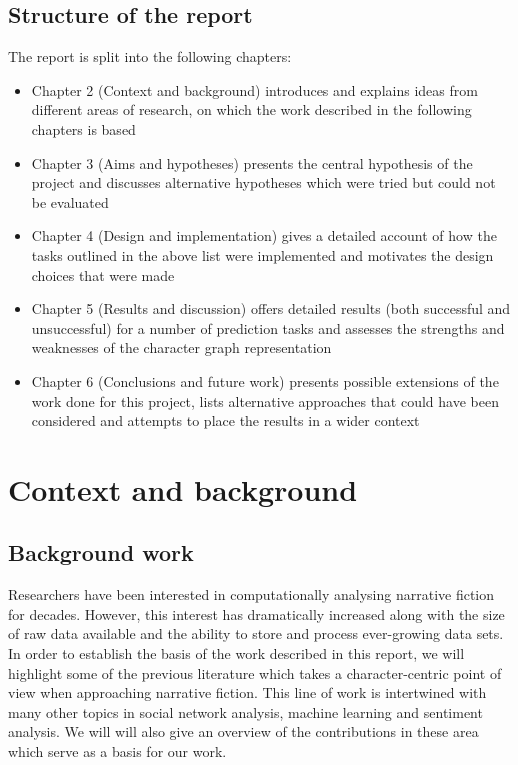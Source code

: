 \documentclass[bsc,frontabs,singlespacing,parskip, twoside]{infthesis}
\begin{document}
\section{Structure of the report}
The report is split into the following chapters:
\begin{itemize}
	\item Chapter 2 (Context and background) introduces and explains ideas from different areas of research, on which the work described in the following chapters is based
	\item Chapter 3 (Aims and hypotheses) presents the central hypothesis of the project and discusses alternative hypotheses which were tried but could not be evaluated
	\item Chapter 4 (Design and implementation) gives a detailed account of how the tasks outlined in the above list were implemented and motivates the design choices that were made
	\item Chapter 5 (Results and discussion) offers detailed results (both successful and unsuccessful) for a number of prediction tasks and assesses the strengths and weaknesses of the character graph representation
	\item Chapter 6 (Conclusions and future work) presents possible extensions of the work done for this project, lists alternative approaches that could have been considered and attempts to place the results in a wider context
\end{itemize}

\chapter{Context and background}
\label{chap:background}

\section{Background work}
Researchers have been interested in computationally analysing narrative fiction for decades. However, this interest has dramatically increased along with the size of raw data available and the ability to store and process ever-growing data sets. In order to establish the basis of the work described in this report, we will highlight some of the previous literature which takes a character-centric point of view when approaching narrative fiction. This line of work is intertwined with many other topics in social network analysis, machine learning and sentiment analysis. We will will also give an overview of the contributions in these area which serve as a basis for our work.
\end{document}
